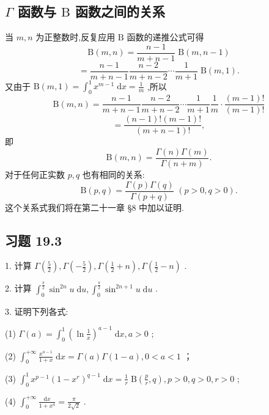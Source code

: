 \subsection{ \(\Gamma\) 函数与 \(\mathrm{B}\) 函数之间的关系}

当 \(m,n\) 为正整数时,反复应用 \(\mathrm{B}\) 函数的递推公式可得
\[
\mathrm{B}\left( {m,n}\right)  = \frac{n - 1}{m + n - 1}\mathrm{\;B}\left( {m,n - 1}\right)
\]
\[
= \frac{n - 1}{m + n - 1}\frac{n - 2}{m + n - 2}\cdots \frac{1}{m + 1}\mathrm{\;B}\left( {m,1}\right) .
\]
又由于 \(\mathrm{B}\left( {m,1}\right)  = {\int }_{0}^{1}{x}^{m - 1}\mathrm{\;d}x = \frac{1}{m}\) ,所以
\[
\mathrm{B}\left( {m,n}\right)  = \frac{n - 1}{m + n - 1}\frac{n - 2}{m + n - 2}\cdots \frac{1}{m + 1}\frac{1}{m} \cdot  \frac{\left( {m - 1}\right) !}{\left( {m - 1}\right) !}
\]
\[
= \frac{\left( {n - 1}\right) !\left( {m - 1}\right) !}{\left( {m + n - 1}\right) !},
\]
即
\[
\mathrm{B}\left( {m,n}\right)  = \frac{\Gamma \left( n\right) \Gamma \left( m\right) }{\Gamma \left( {n + m}\right) }. \tag{12}
\]
对于任何正实数 \(p,q\) 也有相同的关系:
\[
\mathrm{B}\left( {p,q}\right)  = \frac{\Gamma \left( p\right) \Gamma \left( q\right) }{\Gamma \left( {p + q}\right) }\;\left( {p > 0,q > 0}\right) . \tag{13}
\]
这个关系式我们将在第二十一章 §8 中加以证明.

\subsection{习题 19.3}

1. 计算 \(\Gamma \left( \frac{5}{2}\right) ,\Gamma \left( {-\frac{5}{2}}\right) ,\Gamma \left( {\frac{1}{2} + n}\right) ,\Gamma \left( {\frac{1}{2} - n}\right)\) .

2. 计算 \({\int }_{0}^{\frac{\pi }{2}}{\sin }^{2n}u\mathrm{\;d}u,{\int }_{0}^{\frac{\pi }{2}}{\sin }^{{2n} + 1}u\mathrm{\;d}u\) .

3. 证明下列各式:

(1) \(\Gamma \left( a\right)  = {\int }_{0}^{1}{\left( \ln \frac{1}{x}\right) }^{a - 1}\mathrm{\;d}x,a > 0\) ;

(2) \({\int }_{0}^{+\infty }\frac{{x}^{a - 1}}{1 + x}\mathrm{\;d}x = \Gamma \left( a\right) \Gamma \left( {1 - a}\right) ,0 < a < 1\) ；

(3) \({\int }_{0}^{1}{x}^{p - 1}{\left( 1 - {x}^{r}\right) }^{q - 1}\mathrm{\;d}x = \frac{1}{r}\mathrm{\;B}\left( {\frac{p}{r},q}\right) ,p > 0,q > 0,r > 0\) ;

(4) \({\int }_{0}^{+\infty }\frac{\mathrm{d}x}{1 + {x}^{4}} = \frac{\pi }{2\sqrt{2}}\) .

